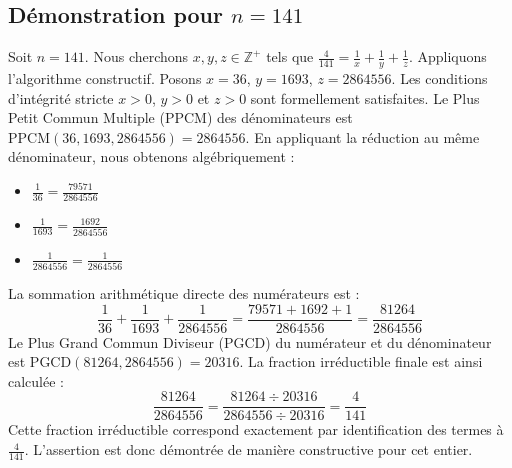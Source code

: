 \documentclass[11pt,a4paper]{article}
\begin{document}
\subsection{Démonstration pour $n = 141$}
Soit $n = 141$. Nous cherchons $x, y, z \in \mathbb{Z}^{+}$ tels que $\frac{4}{141} = \frac{1}{x} + \frac{1}{y} + \frac{1}{z}$.
Appliquons l'algorithme constructif. Posons $x = 36$, $y = 1693$, $z = 2864556$.
Les conditions d'intégrité stricte $x > 0$, $y > 0$ et $z > 0$ sont formellement satisfaites.
Le Plus Petit Commun Multiple (PPCM) des dénominateurs est $\text{PPCM}(36, 1693, 2864556) = 2864556$.
En appliquant la réduction au même dénominateur, nous obtenons algébriquement :
\begin{itemize}
    \item $\frac{1}{36} = \frac{79571}{2864556}$
    \item $\frac{1}{1693} = \frac{1692}{2864556}$
    \item $\frac{1}{2864556} = \frac{1}{2864556}$
\end{itemize}
La sommation arithmétique directe des numérateurs est :
$$ \frac{1}{36} + \frac{1}{1693} + \frac{1}{2864556} = \frac{79571 + 1692 + 1}{2864556} = \frac{81264}{2864556} $$
Le Plus Grand Commun Diviseur (PGCD) du numérateur et du dénominateur est $\text{PGCD}(81264, 2864556) = 20316$.
La fraction irréductible finale est ainsi calculée :
$$ \frac{81264}{2864556} = \frac{81264 \div 20316}{2864556 \div 20316} = \frac{4}{141} $$
Cette fraction irréductible correspond exactement par identification des termes à $\frac{4}{141}$. L'assertion est donc démontrée de manière constructive pour cet entier.
\end{document}
